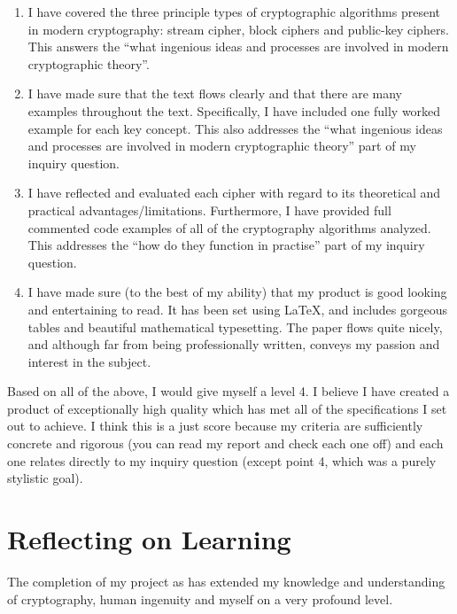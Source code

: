 \documentclass[12pt, a4paper, draft]{report}
\begin{document}
\begin{enumerate}
\item I have covered the three principle types of cryptographic algorithms
present in modern cryptography: stream cipher, block ciphers and public-key
ciphers. This answers the ``what ingenious ideas and processes are involved
in modern cryptographic theory''.

\item I have made sure that the text flows clearly and that there are many
examples throughout the text. Specifically, I have included one fully worked
example for each key concept. This also addresses the ``what ingenious ideas
and processes are involved in modern cryptographic theory'' part of my inquiry
question.


\item I have reflected and evaluated each cipher with regard to its theoretical
and practical advantages/limitations. Furthermore, I have provided full commented
code examples of all of the cryptography algorithms analyzed. This addresses
the ``how do they function in practise'' part of my inquiry question.

\item I have made sure (to the best of my ability) that my product is good
looking and entertaining to read. It has been set using {\LaTeX}, and includes
gorgeous tables and beautiful mathematical typesetting. The paper flows quite
nicely, and although far from being professionally written, conveys my passion
and interest in the subject.
\end{enumerate}

Based on all of the above, I would give myself a level 4. I believe I have
created a product of exceptionally high quality which has met all of the
specifications I set out to achieve. I think this is a just score because my
criteria are sufficiently concrete and rigorous (you can read my report and
check each one off) and each one relates directly to my inquiry question
(except point 4, which was a purely stylistic goal).

\section*{Reflecting on Learning}

The completion of my project as has extended my knowledge and understanding of
cryptography, human ingenuity and myself on a very profound level.
\end{document}

